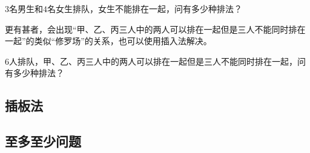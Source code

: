 \begin{example}
	$3$名男生和$4$名女生排队，女生不能排在一起，问有多少种排法？
\end{example}

更有甚者，会出现“甲、乙、丙三人中的两人可以排在一起但是三人不能同时排在一起”的类似“修罗场”的关系，也可以使用插入法解决。

\begin{example}
	$6$人排队，甲、乙、丙三人中的两人可以排在一起但是三人不能同时排在一起，问有多少种排法？
\end{example}

\subsection{插板法}

\subsection{至多至少问题}
